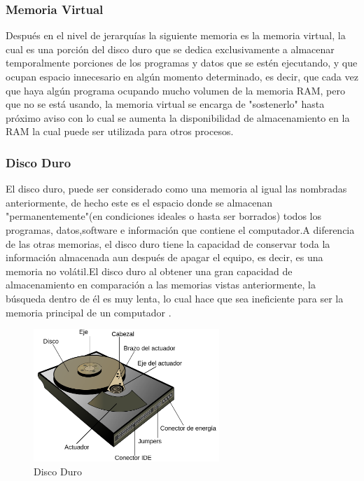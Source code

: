 \documentclass{article}
\begin{document}
\subsubsection{Memoria Virtual}
Después en el nivel de jerarquías la siguiente memoria es la memoria virtual, la cual es una porción del disco duro que se dedica exclusivamente a almacenar temporalmente porciones de los programas y datos que se estén ejecutando, y que ocupan espacio innecesario en algún momento determinado, es decir, que cada vez que haya algún programa ocupando mucho volumen de la memoria RAM, pero que no se está usando, la memoria virtual se encarga de "sostenerlo" hasta próximo aviso con lo cual se aumenta la disponibilidad de almacenamiento en la RAM la cual puede ser utilizada para otros procesos\cite{augusto}.

\subsubsection{Disco Duro}
El disco duro, puede ser considerado como una memoria al igual las nombradas anteriormente, de hecho este es el espacio donde se almacenan "permanentemente"(en condiciones ideales o hasta ser borrados) todos los programas, datos,software e información que contiene el computador.A diferencia de las otras memorias, el disco duro tiene la capacidad de conservar toda la información almacenada aun después de apagar el equipo, es decir, es una memoria no volátil.El disco duro al obtener una gran capacidad de almacenamiento en comparación a las memorias vistas anteriormente, la búsqueda dentro de él es muy lenta, lo cual hace que sea ineficiente para ser la memoria principal de un computador \cite{disco}.

\begin{figure}[h]
\includegraphics[width=7cm]{HDD.png}
\centering
\caption{Disco Duro}
\label{hdd}
\end{figure}
\end{document}
